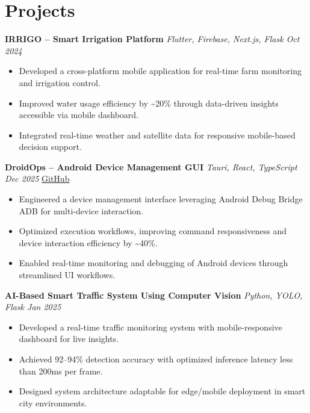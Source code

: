 \documentclass[a4paper,10pt]{article}
\begin{document}
\section*{Projects}

\textbf{IRRIGO -- Smart Irrigation Platform} \hfill \textit{Flutter, Firebase, Next.js, Flask \quad Oct 2024}
\begin{itemize}
\item Developed a cross-platform mobile application for real-time farm monitoring and irrigation control.
\item Improved water usage efficiency by \textasciitilde{}20\% through data-driven insights accessible via mobile dashboard.
\item Integrated real-time weather and satellite data for responsive mobile-based decision support.
\end{itemize}

\vspace{4pt}

\textbf{DroidOps -- Android Device Management GUI} \hfill \textit{Tauri, React, TypeScript \quad Dec 2025} \quad \href{https://github.com/your-github/droidops}{GitHub}
\begin{itemize}
\item Engineered a device management interface leveraging Android Debug Bridge ADB for multi-device interaction.
\item Optimized execution workflows, improving command responsiveness and device interaction efficiency by \textasciitilde{}40\%.
\item Enabled real-time monitoring and debugging of Android devices through streamlined UI workflows.
\end{itemize}

\vspace{4pt}

\textbf{AI-Based Smart Traffic System Using Computer Vision} \hfill \textit{Python, YOLO, Flask \quad Jan 2025}
\begin{itemize}
\item Developed a real-time traffic monitoring system with mobile-responsive dashboard for live insights.
\item Achieved 92--94\% detection accuracy with optimized inference latency less than 200ms per frame.
\item Designed system architecture adaptable for edge/mobile deployment in smart city environments.
\end{itemize}
\end{document}
